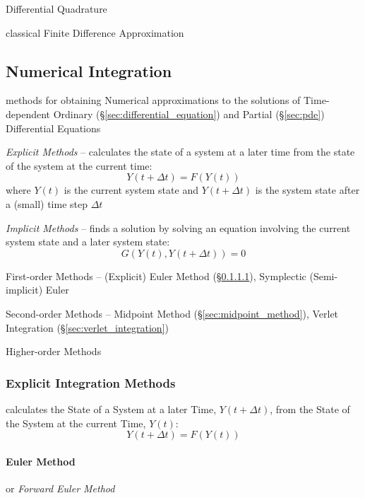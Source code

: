 Differential Quadrature

classical Finite Difference Approximation



\subsection{Numerical Integration}\label{sec:numerical_integration}

methods for obtaining Numerical approximations to the solutions of
Time-dependent Ordinary (\S\ref{sec:differential_equation}) and Partial
(\S\ref{sec:pde}) Differential Equations

\emph{Explicit Methods} -- calculates the state of a system at a later time
from the state of the system at the current time:
\[
  Y(t+\Delta{t}) = F(Y(t))
\]
where $Y(t)$ is the current system state and $Y(t + \Delta{t})$ is the system
state after a (small) time step $\Delta{t}$

\emph{Implicit Methods} -- finds a solution by solving an equation involving
the current system state and a later system state:
\[
  G(Y(t), Y(t + \Delta{t})) = 0
\]

First-order Methods -- (Explicit) Euler Method (\S\ref{sec:euler_method}),
Symplectic (Semi-implicit) Euler

Second-order Methods -- Midpoint Method (\S\ref{sec:midpoint_method}), Verlet
Integration (\S\ref{sec:verlet_integration})

Higher-order Methods



\subsubsection{Explicit Integration Methods}\label{sec:explicit_integration}

calculates the State of a System at a later Time, $Y(t + \Delta{t})$, from the
State of the System at the current Time, $Y(t)$:
\[
  Y(t + \Delta{t}) = F(Y(t))
\]



\paragraph{Euler Method}\label{sec:euler_method}\hfill

or \emph{Forward Euler Method}

